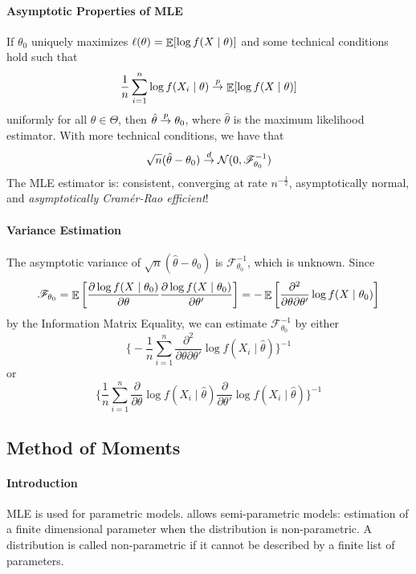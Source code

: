\documentclass[10pt]{article}
\begin{document}
\paragraph{Asymptotic Properties of MLE} If $\theta_0$ uniquely maximizes $\ell(\theta) = \mathop{\mathbb{E}}[\log f(X \mid \theta)]$ and some technical conditions hold such that
\[
\frac{1}{n} \sum_{i=1}^n \log f(X_i \mid \theta) \overset{p}{\to} \mathop{\mathbb{E}}[\log f(X \mid \theta)]
\]
uniformly for all $\theta \in \Theta$, then $\hat{\theta} \overset{p}{\to} \theta_0$, where $\hat{\theta}$ is the maximum likelihood estimator. With more technical conditions, we have that
\[
\sqrt{n}(\hat{\theta} - \theta_0) \overset{d}{\to} \mathcal{N}(0,\mathscr{F}_{\theta_0}^{-1})
\]
The MLE estimator is: consistent, converging at rate $n^{-\frac{1}{2}}$, asymptotically normal, and \emph{asymptotically Cram\'{e}r-Rao efficient}!

\paragraph{Variance Estimation} The asymptotic variance of $\sqrt{n}(\hat{\theta} - \theta_0)$ is $\mathscr{F}_{\theta_0}^{-1}$, which is unknown. Since
\[
\mathscr{F}_{\theta_0} = \mathop{\mathbb{E}} \left[ \frac{\partial \log f(X \mid \theta_0)}{\partial \theta} \frac{\partial \log f(X \mid \theta_0)}{\partial \theta'}\right] = -\mathop{\mathbb{E}} \left[ \frac{\partial^2}{\partial\theta\partial\theta'} \log f(X \mid \theta_0)\right]
\]
by the Information Matrix Equality, we can estimate $\mathscr{F}_{\theta_0}^{-1}$ by either
\[
\Bigg\{ -\frac{1}{n} \sum_{i=1}^n \frac{\partial^2}{\partial \theta \partial \theta'} \log f(X_i \mid \hat{\theta}) \Bigg\}^{-1}
\]
or
\[
\Bigg\{ \frac{1}{n} \sum_{i=1}^n \frac{\partial}{\partial \theta} \log f(X_i \mid \hat{\theta})\frac{\partial}{\partial \theta'} \log f(X_i \mid \hat{\theta}) \Bigg\}^{-1}
\]

\subsection{Method of Moments}

\paragraph{Introduction} MLE is used for parametric models.  allows semi-parametric models: estimation of a finite dimensional parameter when the distribution is non-parametric. A distribution is called non-parametric if it cannot be described by a finite list of parameters. 
\end{document}
